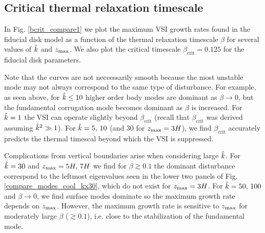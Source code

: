 


\subsection{Critical thermal relaxation
  timescale}\label{bcrit_num_test}
In Fig. \ref{bcrit_compare1} we plot the maximum VSI growth rates
found in the fiducial disk model as a function of the thermal
relaxation timescale $\beta$ for several values of $\hat{k}$ and
$z_\mathrm{max}$. We also plot the critical timescale
$\beta_\mathrm{crit}=0.125$ for the fiducial disk parameters.   

Note that the curves are not neccessarily smooth because the most unstable
mode may not always correspond to the same type of disturbance. For example,
as seen above, for $\hat{k} \leq 10$ higher order body modes are
dominant as $\beta\to 0$, but the fundamental corrugation
mode becomes dominant as $\beta$ is increased. For $\hat{k}=1$ the VSI
can operate slightly beyond $\beta_\mathrm{crit}$  (recall that
$\beta_\mathrm{crit}$ was derived assuming $\hat{k}^2\gg 1$). For
$\hat{k}=5,\,10$ (and $30$ for $z_\mathrm{max}=3H$), we find
$\beta_\mathrm{crit}$ accurately predicts the thermal timescal beyond
which the VSI is suppressed.   

Complications from vertical boundaries arise when considering large
$\hat{k}$. For $\hat{k}=30$ and $z_\mathrm{max}=5H,\,7H$ we find for $\beta\gtrsim
0.1$ the dominant disturbance correspond to the leftmost eigenvalues 
seen in the lower two panels of Fig. \ref{compare_modes_cool_kx30},
which do not exist for $z_\mathrm{max}=3H$. For $\hat{k}=50,\,100$ and
$\beta\to0$, we find surface modes dominate so the maximum growth rate
depends on $z_\mathrm{max}$. However, the maximum growth rate is sensitive to
$z_\mathrm{max}$ for moderately large $\beta$ ($\gtrsim 0.1$), i.e. close to
the stabilization of the fundamental mode. 


